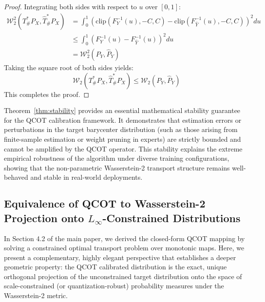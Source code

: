 \documentclass{article}
\theoremstyle{plain}
\theoremstyle{definition}
\theoremstyle{remark}
\begin{document}
\begin{proof}
Integrating both sides with respect to $u$ over $[0, 1]$:
\begin{align}
    \mathcal{W}_2^2\left( T^*_{\#} P_X, \widehat{T}^*_{\#} P_X \right) &= \int_{0}^{1} \left( \text{clip}(F_Y^{-1}(u), -C, C) - \text{clip}(F_{\widehat{Y}}^{-1}(u), -C, C) \right)^2 du \nonumber \\
    &\le \int_{0}^{1} \left( F_Y^{-1}(u) - F_{\widehat{Y}}^{-1}(u) \right)^2 du \nonumber \\
    &= \mathcal{W}_2^2\left( P_Y, \widehat{P}_Y \right)
\end{align}
Taking the square root of both sides yields:
\begin{equation}
    \mathcal{W}_2\left( T^*_{\#} P_X, \widehat{T}^*_{\#} P_X \right) \le \mathcal{W}_2\left( P_Y, \widehat{P}_Y \right)
\end{equation}
This completes the proof.
\end{proof}

Theorem~\ref{thm:stability} provides an essential mathematical stability guarantee for the QCOT calibration framework. It demonstrates that estimation errors or perturbations in the target barycenter distribution (such as those arising from finite-sample estimation or weight pruning in experts) are strictly bounded and cannot be amplified by the QCOT operator. This stability explains the extreme empirical robustness of the algorithm under diverse training configurations, showing that the non-parametric Wasserstein-2 transport structure remains well-behaved and stable in real-world deployments.

\subsection{Equivalence of QCOT to Wasserstein-2 Projection onto $L_\infty$-Constrained Distributions}
\label{sec:proof_equivalence}

In Section 4.2 of the main paper, we derived the closed-form QCOT mapping by solving a constrained optimal transport problem over monotonic maps. Here, we present a complementary, highly elegant perspective that establishes a deeper geometric property: the QCOT calibrated distribution is the exact, unique orthogonal projection of the unconstrained target distribution onto the space of scale-constrained (or quantization-robust) probability measures under the Wasserstein-2 metric.
\end{document}
